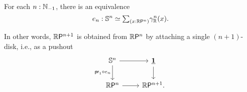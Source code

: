 \begin{thm}\label{thm:Sn_totalcov}
For each $n:\mathbb{N}_{-1}$, there is an equivalence
\begin{equation*}
e_n:\eqv{\sphere{n}}{\sm{x:\rprojective{n}}\tautfam[\R]{n}(x)}.
\end{equation*}
\end{thm}

In other words, $\mathbb{R}\mathsf{P}^{n+1}$ is obtained from $\mathbb{R}\mathsf{P}^{n}$ by attaching a single $(n+1)$\nobreakdash-disk, i.e., as a pushout
\begin{equation*}
\begin{tikzcd}
\sphere{n} \arrow[r] \arrow[d,swap,"\proj1\circ e_n"] & \unit \arrow[d] \\
\rprojective{n} \arrow[r] & \rprojective{n+1}.
\end{tikzcd}
\end{equation*}

